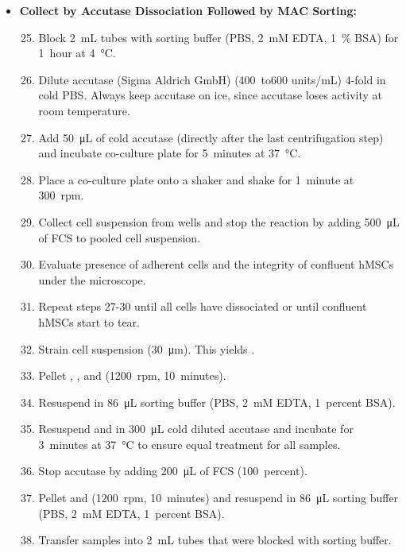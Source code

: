 \begin{itemize}
    \item \textbf{Collect \MAina by Accutase Dissociation Followed by MAC Sorting:}
          \begin{enumerate}
              \setcounter{enumi}{24}
              \item Block \SI{2}{mL} tubes with sorting buffer (PBS, \SI{2}{mM} EDTA, \SI{1}{\percent} BSA) for \SI{1}{hour} at \SI{4}{\degreeCelsius}.
              \item Dilute accutase (Sigma Aldrich GmbH) (\SI{400}{to}{600} units/mL) 4-fold in cold PBS. Always keep accutase on ice, since accutase loses activity at room temperature.
              \item Add \SI{50}{\micro\liter} of cold accutase (directly after the last centrifugation step) and incubate co-culture plate for \SI{5}{minutes} at \SI{37}{\degreeCelsius}.
              \item Place a co-culture plate onto a shaker and shake for \SI{1}{minute} at \SI{300}{rpm}.
              \item Collect cell suspension from wells and stop the reaction by adding \SI{500}{\micro\liter} of FCS to pooled cell suspension.
              \item Evaluate presence of adherent \INA cells and the integrity of confluent hMSCs under the microscope.
              \item Repeat steps 27-30 until all \INA cells have dissociated or until confluent hMSCs start to tear.
              \item Strain cell suspension (\SI{30}{\micro\meter}). This yields \MAina.
              \item Pellet \MAina, \nMAina, and \CMina (\SI{1200}{rpm}, \SI{10}{minutes}).
              \item Resuspend \MAina in \SI{86}{\micro\liter} sorting buffer (PBS, \SI{2}{mM} EDTA, \SI{1}{percent} BSA).
              \item Resuspend \CMina and \nMAina in \SI{300}{\micro\liter} cold diluted accutase and incubate for \SI{3}{minutes} at \SI{37}{\degreeCelsius} to ensure equal treatment for all samples.
              \item Stop accutase by adding \SI{200}{\micro\liter} of FCS (\SI{100}{percent}).
              \item Pellet \CMina and \nMAina (\SI{1200}{rpm}, \SI{10}{minutes}) and resuspend in \SI{86}{\micro\liter} sorting buffer (PBS, \SI{2}{mM} EDTA, \SI{1}{percent} BSA).
              \item Transfer samples into \SI{2}{mL} tubes that were blocked with sorting buffer.

\end{enumerate}
\end{itemize}

